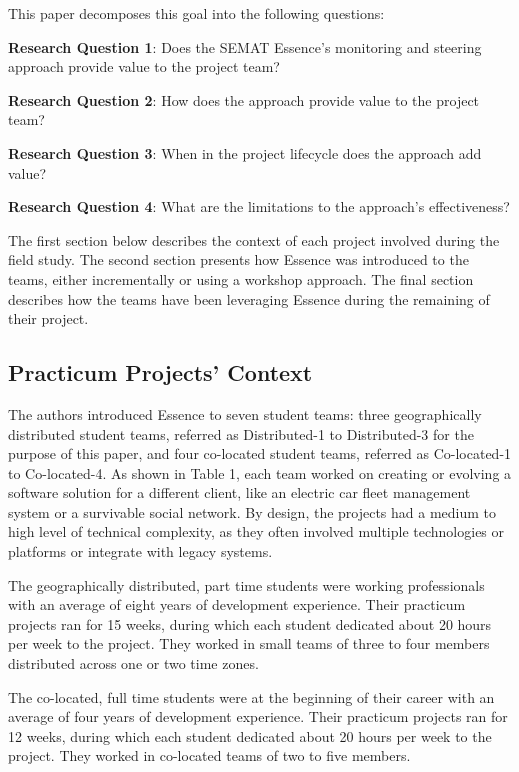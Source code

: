 This paper decomposes this goal into the following questions:

\textbf{Research Question 1}: Does the SEMAT Essence's monitoring and steering approach provide value to the project team?

\textbf{Research Question 2}: How does the approach provide value to the project team?

\textbf{Research Question 3}: When in the project lifecycle does the approach add value?

\textbf{Research Question 4}: What are the limitations to the approach's effectiveness?

The first section below describes the context of each project involved during the field study. The second section presents how Essence was introduced to the teams, either incrementally or using a workshop approach. The final section describes how the teams have been leveraging Essence during the remaining of their project.

\subsection{Practicum Projects' Context}

The authors introduced Essence to seven student teams: three geographically distributed student teams, referred as Distributed-1 to Distributed-3 for the purpose of this paper, and four co-located student teams, referred as Co-located-1 to Co-located-4. As shown in Table 1, each team worked on creating or evolving a software solution for a different client, like an electric car fleet management system or a survivable social network. By design, the projects had a medium to high level of technical complexity, as they often involved multiple technologies or platforms or integrate with legacy systems.

The geographically distributed, part time students were working professionals with an average of eight years of development experience. Their practicum projects ran for 15 weeks, during which each student dedicated about 20 hours per week to the project. They worked in small teams of three to four members distributed across one or two time zones.

The co-located, full time students were at the beginning of their career with an average of four years of development experience. Their practicum projects ran for 12 weeks, during which each student dedicated about 20 hours per week to the project. They worked in co-located teams of two to five members.

